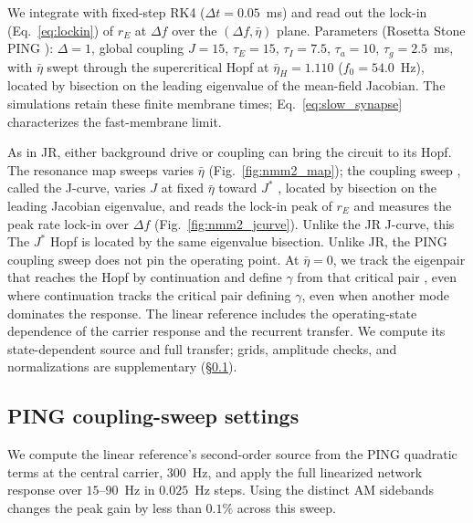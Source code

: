 \documentclass[11pt,a4paper]{article}
\newif\ifjne
\providecommand{\DIFaddtex}[1]{{\protect\color{blue} \sf #1}} %
\providecommand{\DIFdeltex}[1]{{\protect\color{red} \scriptsize #1}} %
\providecommand{\DIFaddbegin}{} %
\providecommand{\DIFaddend}{} %
\providecommand{\DIFdelbegin}{} %
\providecommand{\DIFdelend}{} %
\providecommand{\DIFadd}[1]{\texorpdfstring{\DIFaddtex{#1}}{#1}} %
\providecommand{\DIFdel}[1]{\texorpdfstring{\DIFdeltex{#1}}{}} %
\begin{document}
We integrate with fixed-step RK4 ($\Delta t=0.05$~ms) and read out the lock-in
(Eq.~\eqref{eq:lockin}) of $r_E$ at $\Delta f$ over the $(\Delta f, \bar\eta)$ plane.
Parameters (Rosetta Stone PING \cite{ruffini2025rosetta}): $\Delta=1$, global coupling
$J=15$, $\tau_E=15$, $\tau_I=7.5$, $\tau_a=10$, $\tau_g=2.5$~ms, with $\bar\eta$ swept
through the supercritical Hopf at $\bar\eta_H=1.110$ ($f_0=54.0$~Hz), located by bisection
on the leading eigenvalue of the mean-field Jacobian. The simulations retain these
finite membrane times; Eq.~\eqref{eq:slow_synapse} characterizes the fast-membrane limit.

\DIFdelbegin \DIFdel{As in JR, either background drive or coupling can bring the circuit to its Hopf.
}\DIFdelend The resonance map \DIFdelbegin \DIFdel{sweeps }\DIFdelend \DIFaddbegin \DIFadd{varies }\DIFaddend $\bar\eta$ (Fig.~\ref{fig:nmm2_map}); the
coupling sweep \DIFdelbegin \DIFdel{,
called the J-curve, }\DIFdelend varies $J$ at fixed $\bar\eta$ toward $J^*$ \DIFdelbegin \DIFdel{, located by bisection on the leading
Jacobian eigenvalue, and reads the
lock-in peak of $r_E$ }\DIFdelend \DIFaddbegin \DIFadd{and measures the
peak rate lock-in }\DIFaddend over $\Delta f$ (Fig.~\ref{fig:nmm2_jcurve}).
\DIFdelbegin \DIFdel{Unlike the JR J-curve, this }\DIFdelend \DIFaddbegin \DIFadd{The $J^*$ Hopf is located by the same eigenvalue bisection.
Unlike JR, the PING coupling }\DIFaddend sweep does not pin the operating point. At
$\bar\eta=0$, \DIFdelbegin \DIFdel{we track the eigenpair that reaches the Hopf by
continuation and define $\gamma$ from that critical pair , even where }\DIFdelend \DIFaddbegin \DIFadd{continuation tracks the critical pair defining $\gamma$,
even when }\DIFaddend another mode dominates\DIFdelbegin \DIFdel{the response}\DIFdelend . The linear reference includes the
\DIFdelbegin \DIFdel{operating-state
dependence of the carrier response and the recurrent transfer. We compute its
}\DIFdelend \DIFaddbegin \DIFadd{state-dependent source and full transfer; grids, amplitude checks, and
normalizations are supplementary (\S\ref{supp:ping-runs}).
}

\ifjne\else
\subsection{\DIFadd{PING coupling-sweep settings}}\label{supp:ping-runs}
\DIFadd{We compute the linear reference's
}\DIFaddend second-order source from the PING quadratic terms at the central carrier,
$300$~Hz, and apply the full linearized network response over $15$--$90$~Hz
in $0.025$~Hz steps. Using the distinct AM sidebands changes the peak gain by
less than $0.1\%$ across this sweep.
\end{document}
